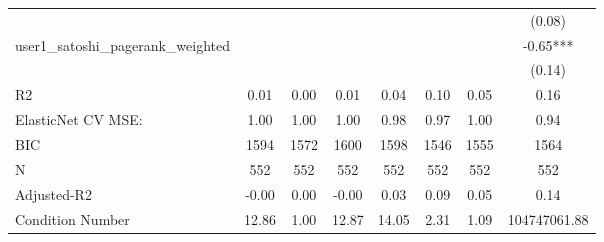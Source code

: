 \begin{table}
\begin{center}
\begin{tabular}{lccccccc}
                                      &          &            &         &         &          &                    & (0.08)        \\
user1_satoshi_pagerank_weighted       &          &            &         &         &          &                    & -0.65***      \\
                                      &          &            &         &         &          &                    & (0.14)        \\
R2                                    & 0.01     & 0.00       & 0.01    & 0.04    & 0.10     & 0.05               & 0.16          \\
ElasticNet CV MSE:                    & 1.00     & 1.00       & 1.00    & 0.98    & 0.97     & 1.00               & 0.94          \\
BIC                                   & 1594     & 1572       & 1600    & 1598    & 1546     & 1555               & 1564          \\
N                                     & 552      & 552        & 552     & 552     & 552      & 552                & 552           \\
Adjusted-R2                           & -0.00    & 0.00       & -0.00   & 0.03    & 0.09     & 0.05               & 0.14          \\
Condition Number                      & 12.86    & 1.00       & 12.87   & 14.05   & 2.31     & 1.09               & 104747061.88  \\
\hline
\end{tabular}
\end{center}
\end{table}
